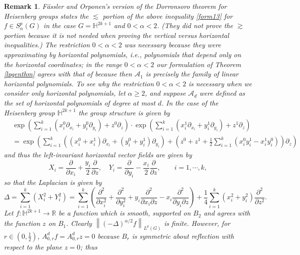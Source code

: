 \documentclass[11pt,reqno]{amsart}
\newtheorem{remark}[theorem]{Remark}
\newcommand{\1}{\mathbf 1}
\begin{document}
\begin{remark}\label{remark:noHori}
F\"assler and Orponen's version \cite{fassler2020dorronsoro} of the Dorronsoro theorem \cite{dorronsoro1985characterization} for Heisenberg groups states the $\lesssim$ portion of the above inequality \eqref{form13} for $f\in S^p_\alpha\left(G\right)$ in the case $G=\mathbb{H}^{2k+1}$ and $0<\alpha<2$. (They did not prove the $\gtrsim$ portion because it is not needed when proving the vertical versus horizontal inequalities.) The restriction $0<\alpha<2$ was necessary because they were approximating by horizontal polynomials, i.e., polynomials that depend only on the horizontal coordinates; in the range $0<\alpha<2$ our formulation of Theorem \ref{lpgenthm} agrees with that of \cite{fassler2020dorronsoro} because then $\mathcal{A}_1$ is precisely the family of linear horizontal polynomials. To see why the restriction $0<\alpha<2$ is necessary when we consider only horizontal polynomials, let $\alpha\ge 2$, and suppose $\mathcal{A}_d$ were defined as the set of horizontal polynomials of degree at most $d$. In the case of the Heisenberg group $\mathbb{H}^{2k+1}$ the group structure is given by
\begin{align*}
&\exp\left(\sum_{i=1}^k\left(x^0_i\partial_{x_i}+y^0_i\partial_{y_i}\right)+z^0\partial_z\right)\cdot \exp\left(\sum_{i=1}^k\left(x^1_i\partial_{x_i}+y^1_i\partial_{y_i}\right)+z^1\partial_z\right) \\
&= \exp\left(\sum_{i=1}^k\left(\left(x^0_i+x^1_i\right)\partial_{x_i}+\left(y^0_i+y^1_i\right)\partial_{y_i}\right)+\left(z^0+z^1+\frac 12\sum_{i=1}^k\left(x_i^0y_i^1-x_i^1y_i^0\right)\right)\partial_z\right)
\end{align*}
and thus the left-invariant horizontal vector fields are given by
\[
X_i=\frac{\partial}{\partial x_i}+\frac{y_i}{2} \frac{\partial}{\partial z},\quad Y_i=\frac{\partial}{\partial y_i}-\frac{x_i}{2} \frac{\partial}{\partial z},\qquad i=1,\cdots,k,
\]
so that the Laplacian is given by
\[
\Delta = \sum_{i=1}^k\left(X_i^2+Y_i^2\right)= \sum_{i=1}^k \left(\frac{\partial^2}{\partial x_i^2}+\frac{\partial^2}{\partial y_i^2}+y_i\frac{\partial^2}{\partial x_i\partial z}-x_i\frac{\partial^2}{\partial y_i\partial z}\right)+\frac 14\sum_{i=1}^k\left(x_i^2+y_i^2\right) \frac{\partial^2}{\partial z^2}.
\]
Let $f:\mathbb{H}^{2k+1}\to \mathbb{R}$ be a function which is smooth, supported on $B_2$ and agrees with the function $z$ on $B_1$. Clearly $\left\|\left(-\Delta\right)^{\alpha/2} f\right\|_{L^p\left(G\right)}$ is finite. However, for $r\in \left(0,\frac 12\right)$, $A^d_{0,r}f=A^d_{0,r}z=0$ because $B_r$ is symmetric about reflection with respect to the plane $z=0$; thus

\end{remark}
\end{document}
